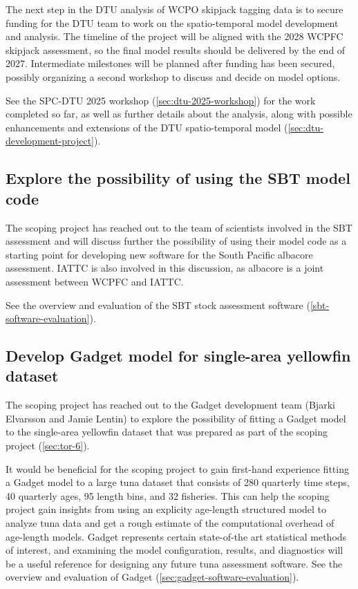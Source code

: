 \documentclass{SCreport}
\begin{document}
The next step in the DTU analysis of WCPO skipjack tagging data is to secure
funding for the DTU team to work on the spatio-temporal model development and
analysis. The timeline of the project will be aligned with the 2028 WCPFC
skipjack assessment, so the final model results should be delivered by the end
of 2027. Intermediate milestones will be planned after funding has been secured,
possibly organizing a second workshop to discuss and decide on model options.

See the SPC-DTU 2025 workshop (\autoref{sec:dtu-2025-workshop}) for the work
completed so far, as well as further details about the analysis, along with
possible enhancements and extensions of the DTU spatio-temporal model
(\autoref{sec:dtu-development-project}).

\vspace{2ex}

\subsection{Explore the possibility of using the SBT model code}
\label{sec:sbt-model-code}

The scoping project has reached out to the team of scientists involved in the
SBT assessment and will discuss further the possibility of using their model
code as a starting point for developing new software for the South Pacific
albacore assessment. IATTC is also involved in this discussion, as albacore is a
joint assessment between WCPFC and IATTC.

See the overview and evaluation of the SBT stock assessment software
(\autoref{sbt-software-evaluation}).

\vspace{2ex}

\subsection{Develop Gadget model for single-area yellowfin dataset}
\label{sec:yft-gadget}

The scoping project has reached out to the Gadget development team (Bjarki
Elvarsson and Jamie Lentin) to explore the possibility of fitting a Gadget model
to the single-area yellowfin dataset that was prepared as part of the scoping
project (\autoref{sec:tor-6}).

It would be beneficial for the scoping project to gain first-hand experience
fitting a Gadget model to a large tuna dataset that consists of 280 quarterly
time steps, 40 quarterly ages, 95 length bins, and 32 fisheries. This can help
the scoping project gain insights from using an explicity age-length structured
model to analyze tuna data and get a rough estimate of the computational
overhead of age-length models. Gadget represents certain state-of-the art
statistical methods of interest, and examining the model configuration, results,
and diagnostics will be a useful reference for designing any future tuna
assessment software. See the overview and evaluation of Gadget
(\autoref{sec:gadget-software-evaluation}).
\end{document}
